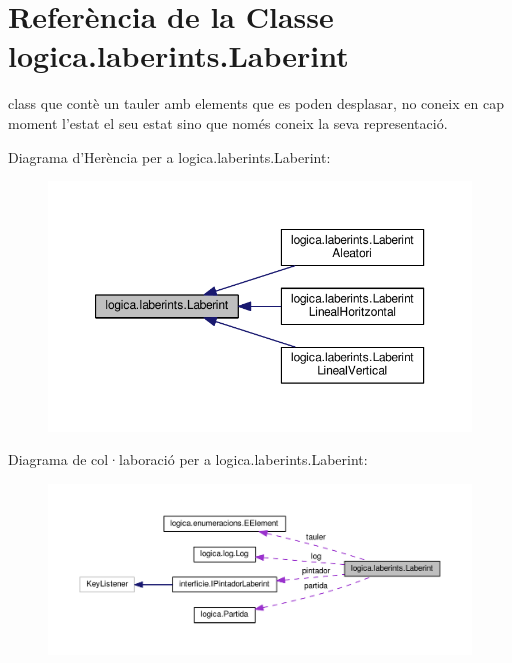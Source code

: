 \hypertarget{classlogica_1_1laberints_1_1_laberint}{\section{Referència de la Classe logica.\+laberints.\+Laberint}
\label{classlogica_1_1laberints_1_1_laberint}
}


class que contè un tauler amb elements que es poden desplasar, no coneix en cap moment l'estat el seu estat sino que només coneix la seva representació.  




Diagrama d'Herència per a logica.\+laberints.\+Laberint\+:\nopagebreak
\begin{figure}[H]
\begin{center}
\leavevmode
\includegraphics[width=350pt]{classlogica_1_1laberints_1_1_laberint__inherit__graph}
\end{center}
\end{figure}


Diagrama de col·laboració per a logica.\+laberints.\+Laberint\+:\nopagebreak
\begin{figure}[H]
\begin{center}
\leavevmode
\includegraphics[width=350pt]{classlogica_1_1laberints_1_1_laberint__coll__graph}
\end{center}
\end{figure}
